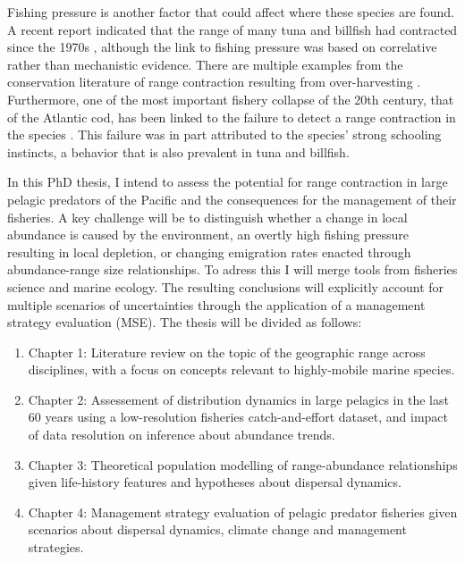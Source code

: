 \documentclass{article}
\begin{document}
Fishing pressure is another factor that could affect where these
species are found. A recent report indicated that the range of many
tuna and billfish had contracted since the 1970s \citep{Worm2011_a},
although the link to fishing pressure was based on correlative rather
than mechanistic evidence. There are multiple examples from the
conservation literature of range contraction resulting from
over-harvesting \citep[e.g.][]{Laliberte2004_a}. Furthermore, one of the most
important fishery collapse of the 20th century, that of the Atlantic cod,
has been linked to the failure to detect a range contraction in the
species \citep{Rose1999_a}. This failure was in part attributed to the
species' strong schooling instincts, a behavior that is also prevalent
in tuna and billfish.

In this PhD thesis, I intend to assess the potential for range
contraction in large pelagic predators of the Pacific and the
consequences for the management of their fisheries. A key challenge will
be to distinguish whether a change in local abundance is caused by the
environment, an overtly high
fishing pressure resulting in local depletion, or changing
emigration rates enacted through abundance-range size
relationships. To adress this I will merge tools from fisheries
science and marine ecology. The resulting conclusions
will explicitly account for multiple scenarios
of uncertainties through the application of a management strategy
evaluation (MSE). The thesis will be divided as follows:

\begin{enumerate}[{\tiny $\bullet$}]
\item Chapter 1: Literature review on the topic of the geographic range
across disciplines, with a focus on concepts relevant to highly-mobile
marine species.
\item Chapter 2: Assessement of distribution dynamics in large
  pelagics in the last 60 years using a
low-resolution fisheries catch-and-effort dataset, and impact of data
resolution on inference about abundance trends.
\item Chapter 3: Theoretical population modelling of range-abundance
relationships given life-history features and hypotheses about
dispersal dynamics.
\item Chapter 4: Management strategy evaluation of pelagic predator
fisheries given scenarios about dispersal dynamics, climate change and
management strategies.
\end{enumerate}
\end{document}
